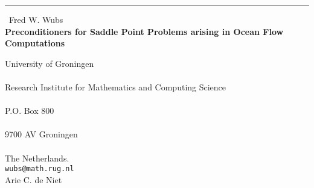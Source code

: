 \documentclass{report}
\begin{document}
\begin{center}
\rule{6in}{1pt} \
{\large Fred W. Wubs \\
{\bf Preconditioners for Saddle Point Problems arising in Ocean Flow Computations}}

University of Groningen \\  \\ Research Institute for Mathematics and Computing Science \\  \\ P.O. Box 800 \\  \\ 9700 AV Groningen \\ \\ The Netherlands.
\\
{\tt wubs@math.rug.nl}\\
Arie C. de Niet\end{center}
\end{document}
